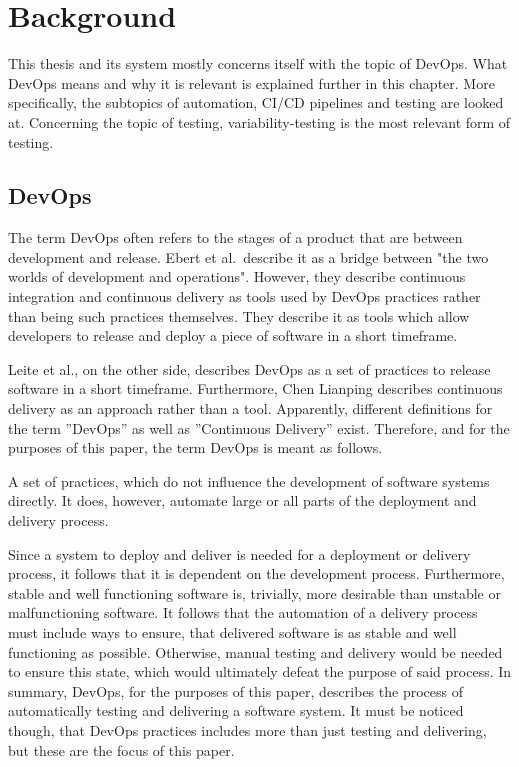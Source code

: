 \chapter{Background}\label{ch:background}

This thesis and its system mostly concerns itself with the topic of DevOps.
What DevOps means and why it is relevant is explained further in this chapter.
More specifically, the subtopics of automation, CI/CD pipelines and testing are looked at.
Concerning the topic of testing, variability-testing is the most relevant form of testing.

\section{DevOps}\label{sec:devops}

The term DevOps often refers to the stages of a product that are between development and release.
Ebert et al.\ describe it as a bridge between "the two worlds of development and operations"\cite{DevOps}.
However, they describe continuous integration and continuous delivery as tools used by DevOps practices rather than being such practices themselves.
They describe it as tools which allow developers to release and deploy a piece of software in a short timeframe.

Leite et al., on the other side, describes DevOps as a set of practices to release software in a short timeframe\cite{ASurveyofDevOpsConceptsandChallenges}.
Furthermore, Chen Lianping describes continuous delivery as an approach rather than a tool\cite{ContinuousDeliveryHugeBenefitsButChallengesToo}.
Apparently, different definitions for the term ''DevOps'' as well as ''Continuous Delivery'' exist.
Therefore, and for the purposes of this paper, the term DevOps is meant as follows.

A set of practices, which do not influence the development of software systems directly.
It does, however, automate large or all parts of the deployment and delivery process.

Since a system to deploy and deliver is needed for a deployment or delivery process, it follows that it is dependent on the development process.
Furthermore, stable and well functioning software is, trivially, more desirable than unstable or malfunctioning software.
It follows that the automation of a delivery process must include ways to ensure, that delivered software is as stable and well functioning as possible.
Otherwise, manual testing and delivery would be needed to ensure this state, which would ultimately defeat the purpose of said process.
In summary, DevOps, for the purposes of this paper, describes the process of automatically testing and delivering a software system.
It must be noticed though, that DevOps practices includes more than just testing and delivering, but these are the focus of this paper.

